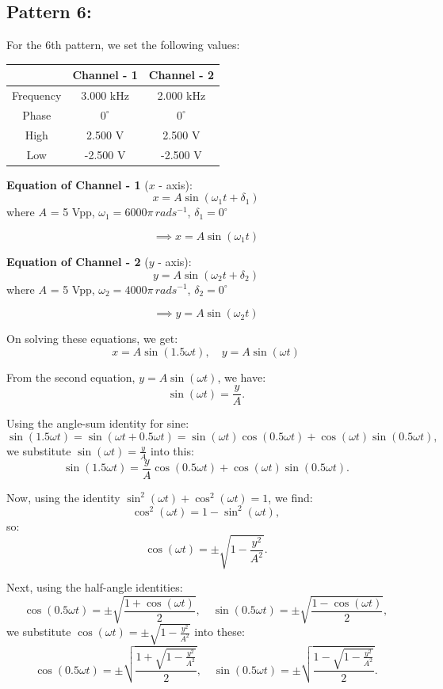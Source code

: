 \documentclass[12pt]{article}
\begin{document}
\subsection{Pattern 6:}
For the 6th pattern, we set the following values:
\begin{table}[H]
    \centering
    \begin{tabular}{|c|c|c|}
    \hline
        & \textbf{Channel - 1} & \textbf{Channel - 2}\\
    \hline
    Frequency & 3.000 kHz & 2.000 kHz\\
    \hline
    Phase     & $0^{\circ}$ & $0^{\circ}$\\
    \hline
    High      & 2.500 V & 2.500 V\\
    \hline
    Low       & -2.500 V & -2.500 V\\
    \hline
    \end{tabular}
\end{table}

\textbf{Equation of Channel - 1} ($x$ - axis):
\[
x = A \sin{\left(\omega_1 t + \delta_1\right)}
\]
where $A$ = 5 Vpp, $\omega_1 = 6000 \pi \, rad s^{-1}$, $\delta_1 = 0^{\circ}$

\[
\implies x = A \sin{\left(\omega_1 t\right)}
\]

\textbf{Equation of Channel - 2} ($y$ - axis):
\[
y = A \sin{\left(\omega_2 t + \delta_2\right)}
\]
where $A$ = 5 Vpp, $\omega_2 = 4000 \pi \, rad s^{-1}$, $\delta_2 = 0^{\circ}$

\[
\implies y = A \sin{\left(\omega_2 t\right)}
\]

On solving these equations, we get:
\[
x = A \sin{\left(1.5\omega t\right)}, \quad y = A \sin{\left(\omega t\right)}
\]

From the second equation, \( y = A \sin(\omega t) \), we have:
\[
\sin(\omega t) = \frac{y}{A}.
\]

Using the angle-sum identity for sine:
\[
\sin(1.5\omega t) = \sin(\omega t + 0.5\omega t) = \sin(\omega t)\cos(0.5\omega t) + \cos(\omega t)\sin(0.5\omega t),
\]
we substitute \( \sin(\omega t) = \frac{y}{A} \) into this:
\[
\sin(1.5\omega t) = \frac{y}{A}\cos(0.5\omega t) + \cos(\omega t)\sin(0.5\omega t).
\]

Now, using the identity \( \sin^2(\omega t) + \cos^2(\omega t) = 1 \), we find:
\[
\cos^2(\omega t) = 1 - \sin^2(\omega t),
\]
so:
\[
\cos(\omega t) = \pm \sqrt{1 - \frac{y^2}{A^2}}.
\]

Next, using the half-angle identities:
\[
\cos(0.5\omega t) = \pm \sqrt{\frac{1 + \cos(\omega t)}{2}}, \quad \sin(0.5\omega t) = \pm \sqrt{\frac{1 - \cos(\omega t)}{2}},
\]
we substitute \( \cos(\omega t) = \pm \sqrt{1 - \frac{y^2}{A^2}} \) into these:
\[
\cos(0.5\omega t) = \pm \sqrt{\frac{1 + \sqrt{1 - \frac{y^2}{A^2}}}{2}}, \quad \sin(0.5\omega t) = \pm \sqrt{\frac{1 - \sqrt{1 - \frac{y^2}{A^2}}}{2}}.
\]
\end{document}
